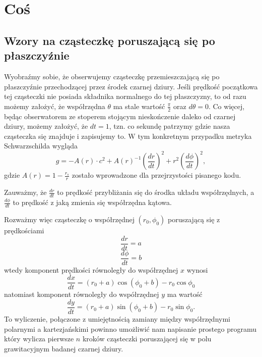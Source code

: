 \section{Coś}

\subsection{Wzory na cząsteczkę poruszającą się po płaszczyźnie}

Wyobraźmy sobie, że obserwujemy cząsteczkę przemieszczającą się po płaszczyźnie przechodzącej przez środek czarnej dziury. Jeśli prędkość początkowa tej cząsteczki nie posiada składnika normalnego do tej płaszczyzny, to od razu możemy założyć, że współrzędna $\theta$ ma stale wartość $\frac{\pi}{2}$ oraz $d\theta=0$. Co więcej, będąc obserwatorem ze stoperem stojącym nieskończenie daleko od czarnej dziury, możemy założyć, że $dt=1$, tzn. co sekundę patrzymy gdzie nasza cząsteczka się znajduje i zapisujemy to. W tym konkretnym przypadku metryka Schwarzschilda wygląda
$$g=-A(r)\cdot c^2+ A(r)^{-1}\left(\frac{dr}{dt}\right)^2+r^2\left(\frac{d\phi}{dt}\right)^2,$$
gdzie $A(r)=1-\frac{r_s}{r}$ zostało wprowadzone dla przejrzystości pisanego kodu.

Zauważmy, że $\frac{dr}{dt}$ to prędkość przybliżania się do środka układu współrzędnych, a $\frac{d\phi}{dt}$ to prędkość z jaką zmienia się współrzędna kątowa. 

Rozważmy więc cząsteczkę o współrzędnej $(r_0, \phi_0)$ poruszającą się z prędkościami
$$\frac{dr}{dt}=a$$
$$\frac{d\phi}{dt}=b$$
wtedy komponent prędkości równoległy do współrzędnej $x$ wynosi
$$\frac{dx}{dt}=(r_0+a)\cos(\phi_0+b)-r_0\cos\phi_0$$
natomiast komponent równoległy do współrzędnej $y$ ma wartość
$$\frac{dy}{dt}=(r_0+a)\sin(\phi_0+b)-r_0\sin\phi_0.$$
To wyliczenie, połączone z umiejętnością zamiany między współrzędnymi polarnymi a kartezjańskimi powinno umożliwić nam napisanie prostego programu który wylicza pierwsze $n$ kroków cząsteczki poruszającej się w polu grawitacyjnym badanej czarnej dziury.
